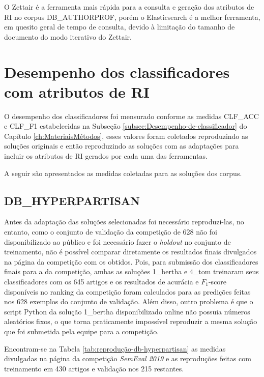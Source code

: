 			O Zettair é a ferramenta mais rápida para a consulta e geração dos atributos de RI no corpus DB\_AUTHORPROF, porém o Elasticsearch é a melhor ferramenta, em quesito geral de tempo de consulta, devido à limitação do tamanho de documento do modo iterativo do Zettair.

	\section{Desempenho dos classificadores com atributos de RI} \label{sec:DesempenhoClassificadores}
		O desempenho dos classificadores foi mensurado conforme as medidas CLF\_ACC e CLF\_F1 estabelecidas na Subseção \ref{subsec:Desempenho-de-classificador} do Capítulo \ref{ch:MateriaisMétodos}, esses valores foram coletados reproduzindo as soluções originais e então reproduzindo as soluções com as adaptações para incluir os atributos de RI gerados por cada uma das ferramentas.

		A seguir são apresentados as medidas coletadas para as soluções dos corpus.

		\subsection{DB\_HYPERPARTISAN}
			Antes da adaptação das soluções selecionadas foi necessário reproduzi-las, no entanto, como o conjunto de validação da competição de 628 não foi disponibilizado ao público e foi necessário fazer o \textit{holdout} no conjunto de treinamento, não é possível comparar diretamente os resultados finais divulgados na página da competição com os obtidos.
			Pois, para submissão dos classificadores finais para a da competição, ambas as soluções 1\_bertha e 4\_tom treinaram seus classificadores com os 645 artigos e os resultados de acurácia e $F_1$-score disponíveis no ranking da competição foram calculados para as predições feitas nos 628 exemplos do conjunto de validação.
			Além disso, outro problema é que o script Python da solução 1\_bertha disponibilizado online não possuia números aleatórios fixos, o que torna praticamente impossível reproduzir a mesma solução que foi submetida pela equipe para a competição.

			Encontram-se na Tabela \ref{tab:reprodução-db-hyperpartisan} as medidas divulgadas na página da competição \textit{SemEval 2019} \cite{PAN_HNDLEADERBOARD_2019} e as reproduções feitas com treinamento em 430 artigos e validação nos 215 restantes.

			

